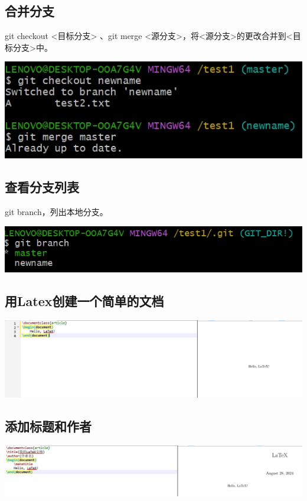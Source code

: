 \documentclass[UTF8,a4paper]{ctexart}
\begin{document}
\begin{sloppypar}
	\subsection{合并分支}
	git checkout <目标分支> 、git merge <源分支>，将<源分支>的更改合并到<目标分支>中。
	
	\includegraphics[width = 16cm]{25}
	
	\subsection{查看分支列表}
	
	git branch，列出本地分支。
	
	\includegraphics[width = 16cm]{26}
	
	\subsection{用Latex创建一个简单的文档}
	
	\includegraphics[width = 16cm]{27}
	
	\subsection{添加标题和作者}
	
	\includegraphics[width = 16cm]{28}
	

\end{sloppypar}
\end{document}
